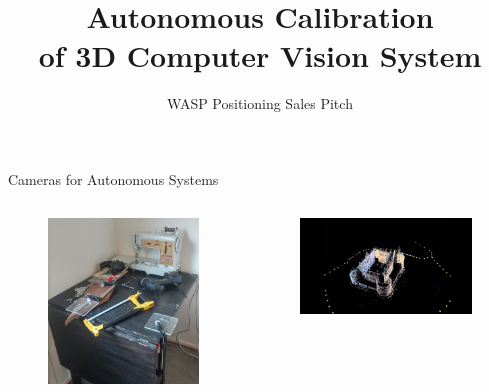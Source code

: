 \documentclass{beamer}
\title[Autonomous Calibration]{\large {Autonomous Calibration}\\ of 3D Computer Vision System}
\date{WASP Positioning Sales Pitch}
\begin{document}
\begin{frame}
  \titlepage
\end{frame}


\begin{frame}{Cameras for Autonomous Systems}
  \begin{columns}
    \begin{column}{0.5\columnwidth}
      \begin{figure}
        \centering
        \includegraphics[width=1.0\textwidth]{problem/recog}
      \end{figure}
    \end{column}
    \begin{column}{0.5\columnwidth}
      \begin{figure}
        \centering
        \includegraphics[width=1.0\textwidth]{problem/sfm}
      \end{figure}
    \end{column}
  \end{columns}
\end{frame}
\end{document}
